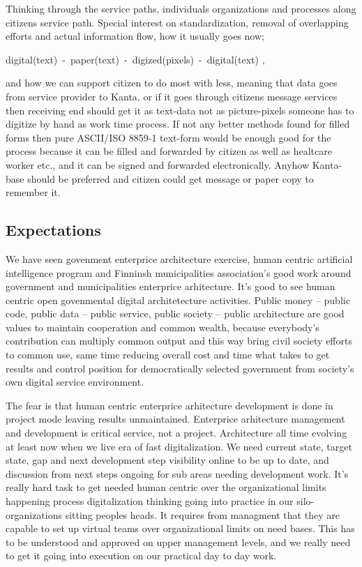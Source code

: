 Thinking through the service paths, individuals organizations and processes
along citizens service path. Special interest on standardization, removal
of overlapping efforts and actual information flow, how it usually goes now;
\hfill\break\begin{center}
digital(text)~-~paper(text)~-~digized(pixels)~-~digital(text)
\cite{VM006_00_2024},\end{center}
and how we can support citizen to do most with less, meaning that data goes
from service provider to Kanta, or if it goes through citizens message services
then receiving end should get it as text-data not as picture-pixels someone
has to digitize by hand as work time process. If not any better methods found
for filled forms then pure ASCII/ISO 8859-1 text-form would be enough good for
the process because it can be filled and forwarded by citizen as well as
healtcare worker etc., and it can be signed and forwarded electronically.
Anyhow Kanta-base should be preferred and citizen could get message or paper
copy to remember it.

\subsection{Expectations}
\label{expectations}

We have seen govenment enterprice architecture exercise, human centric
artificial intelligence program and Finninsh municipalities association's good
work around government and municipalities enterprice arhitecture. It's good
to see human centric open govenmental digital architetecture activities.
Public money -- public code, public data -- public service, public society --
public architecture are good values to maintain cooperation and common wealth,
because everybody's contribution can multiply common output and this way bring
civil society efforts to common use, same time reducing overall cost and time
what takes to get results and control position for democratically selected
government from society's own digital service environment.

The fear is that human centric enterprice arhitecture development is done in
project mode leaving results unmaintained. Enterprice arhitecture management
and development is critical service, not a project. Architecture all time
evolving at least now when we live era of fast digitalization. We need current
state, target state, gap and next development step visibility online to be up
to date, and discussion from next steps ongoing for sub areas needing
development work. It's really hard task to get needed human centric over the
organizational limits happening process digitalization thinking going into
practice in our silo-organizations sitting peoples heads. It requires from
managment that they are capable to set up virtual teams over organizational
limits on need bases. This has to be understood and approved on upper
management levels, and we really need to get it going into execution on our
practical day to day work.

